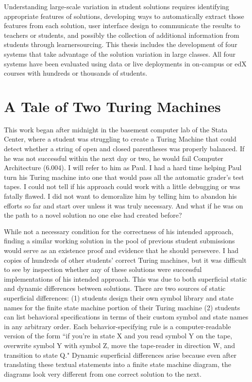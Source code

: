 Understanding large-scale variation in student solutions requires identifying appropriate features of solutions, developing ways to automatically extract those features from each solution, user interface design to communicate the results to teachers or students, and possibly the collection of additional information from students through learnersourcing. This thesis includes the development of four systems that take advantage of the solution variation in large classes. All four systems have been evaluated using data or live deployments in on-campus or edX courses with hundreds or thousands of students.

\section{A Tale of Two Turing Machines}

This work began after midnight in the basement computer lab of the Stata Center, where a student was struggling to create a Turing Machine that could detect whether a string of open and closed parentheses was properly balanced. If he was not successful within the next day or two, he would fail Computer Architecture (6.004). I will refer to him as Paul. I had a hard time helping Paul turn his Turing machine into one that would pass all the automatic grader's test tapes. I could not tell if his approach could work with a little debugging or was fatally flawed. I did not want to demoralize him by telling him to abandon his efforts so far and start over unless it was truly necessary. And what if he was on the path to a novel solution no one else had created before?

While not a necessary condition for the correctness of his intended approach, finding a similar working solution in the pool of previous student submissions would serve as an existence proof and evidence that he should persevere. I had copies of hundreds of other students' correct Turing machines, but it was difficult to see by inspection whether any of these solutions were successful implementations of his intended approach. This was due to both superficial static and dynamic differences between solutions. There are two sources of static superficial differences: (1) students design their own symbol library and state names for the finite state machine portion of their Turing machine (2) students can list behavioral specifications in terms of their custom symbol and state names in any arbitrary order. Each behavior-specifying rule is a computer-readable version of the form ``if you're in state X and you read symbol Y on the tape, overwrite symbol Y with symbol Z, move the tape-reader in direction W, and transition to state Q." Dynamic superficial differences arise because even after translating these textual statements into a finite state machine diagram, the diagrams look very different from one correct solution to the next.

